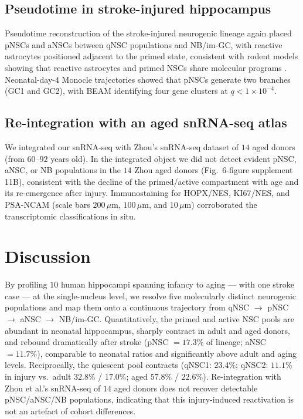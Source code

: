 \documentclass[11pt]{article}
\begin{document}
\subsection{Pseudotime in stroke-injured hippocampus}
Pseudotime reconstruction of the stroke-injured neurogenic lineage again placed pNSCs and aNSCs between qNSC populations and NB/im-GC, with reactive astrocytes positioned adjacent to the primed state, consistent with rodent models showing that reactive astrocytes and primed NSCs share molecular programs \cite{magnusson2014regen,liddelow2017neurotoxic,kimelberg2010reactive}. Neonatal-day-4 Monocle trajectories showed that pNSCs generate two branches (GC1 and GC2), with BEAM identifying four gene clusters at $q < 1 \times 10^{-4}$.

\subsection{Re-integration with an aged snRNA-seq atlas}
We integrated our snRNA-seq with Zhou's snRNA-seq dataset of $14$ aged donors (from $60$--$92$ years old). In the integrated object we did not detect evident pNSC, aNSC, or NB populations in the $14$ Zhou aged donors (Fig.~6-figure supplement 11B), consistent with the decline of the primed/active compartment with age and its re-emergence after injury. Immunostaining for HOPX/NES, KI67/NES, and PSA-NCAM (scale bars $200\,\mu$m, $100\,\mu$m, and $10\,\mu$m) corroborated the transcriptomic classifications in situ.

\section{Discussion}

By profiling $10$ human hippocampi spanning infancy to aging --- with one stroke case --- at the single-nucleus level, we resolve five molecularly distinct neurogenic populations and map them onto a continuous trajectory from qNSC $\to$ pNSC $\to$ aNSC $\to$ NB/im-GC. Quantitatively, the primed and active NSC pools are abundant in neonatal hippocampus, sharply contract in adult and aged donors, and rebound dramatically after stroke (pNSC $= 17.3\%$ of lineage; aNSC $= 11.7\%$), comparable to neonatal ratios and significantly above adult and aging levels. Reciprocally, the quiescent pool contracts (qNSC1: $23.4\%$; qNSC2: $11.1\%$ in injury vs.\ adult $32.8\%$ / $17.0\%$; aged $57.8\%$ / $22.6\%$). Re-integration with Zhou et al.'s snRNA-seq of $14$ aged donors does not recover detectable pNSC/aNSC/NB populations, indicating that this injury-induced reactivation is not an artefact of cohort differences.
\end{document}
